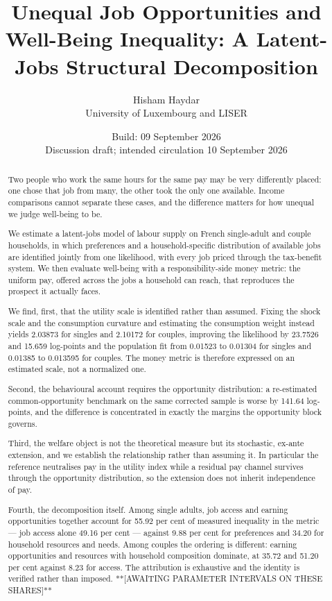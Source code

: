 \documentclass[11pt,a4paper]{article}
\title{Unequal Job Opportunities and Well-Being Inequality: A Latent-Jobs Structural Decomposition}
\author{Hisham Haydar\\University of Luxembourg and LISER}
\date{Build: 09 September 2026\\Discussion draft; intended circulation 10 September 2026}
\begin{document}
\maketitle
\begin{abstract}
Two people who work the same hours for the same pay may be very differently placed: one chose that job from many, the other took the only one available. Income comparisons cannot separate these cases, and the difference matters for how unequal we judge well-being to be.

We estimate a latent-jobs model of labour supply on French single-adult and couple households, in which preferences and a household-specific distribution of available jobs are identified jointly from one likelihood, with every job priced through the tax-benefit system. We then evaluate well-being with a responsibility-side money metric: the uniform pay, offered across the jobs a household can reach, that reproduces the prospect it actually faces.

We find, first, that the utility scale is identified rather than assumed. Fixing the shock scale and the consumption curvature and estimating the consumption weight instead yields 2.03873 for singles and 2.10172 for couples, improving the likelihood by 23.7526 and 15.659 log-points and the population fit from 0.01523 to 0.01304 for singles and 0.01385 to 0.013595 for couples. The money metric is therefore expressed on an estimated scale, not a normalized one.

Second, the behavioural account requires the opportunity distribution: a re-estimated common-opportunity benchmark on the same corrected sample is worse by 141.64 log-points, and the difference is concentrated in exactly the margins the opportunity block governs.

Third, the welfare object is not the theoretical measure but its stochastic, ex-ante extension, and we establish the relationship rather than assuming it. In particular the reference neutralises pay in the utility index while a residual pay channel survives through the opportunity distribution, so the extension does not inherit independence of pay.

Fourth, the decomposition itself. Among single adults, job access and earning opportunities together account for 55.92 per cent of measured inequality in the metric — job access alone 49.16 per cent — against 9.88 per cent for preferences and 34.20 for household resources and needs. Among couples the ordering is different: earning opportunities and resources with household composition dominate, at 35.72 and 51.20 per cent against 8.23 for access. The attribution is exhaustive and the identity is verified rather than imposed. **[AWAITING PARAMETER INTERVALS ON THESE SHARES]**
\end{abstract}
\end{document}

